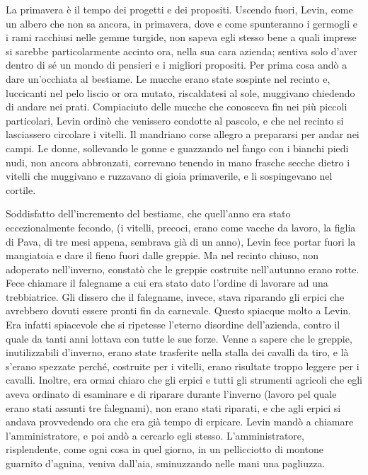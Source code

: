 La primavera è il tempo dei progetti e dei propositi. Uscendo fuori, Levin, come un albero che non sa ancora, in primavera, dove e come spunteranno i germogli e i rami racchiusi nelle gemme turgide, non sapeva egli stesso bene a quali imprese si sarebbe particolarmente accinto ora, nella sua cara azienda; sentiva solo d'aver dentro di sé un mondo di pensieri e i migliori propositi. Per prima cosa andò a dare un'occhiata al bestiame. Le mucche erano state sospinte nel recinto e, luccicanti nel pelo liscio or ora mutato, riscaldatesi al sole, muggivano chiedendo di andare nei prati. Compiaciuto delle mucche che conosceva fin nei più piccoli particolari, Levin ordinò che venissero condotte al pascolo, e che nel recinto si lasciassero circolare i vitelli. Il mandriano corse allegro a prepararsi per andar nei campi. Le donne, sollevando le gonne e guazzando nel fango con i bianchi piedi nudi, non ancora abbronzati, correvano tenendo in mano frasche secche dietro i vitelli che muggivano e ruzzavano di gioia primaverile, e li sospingevano nel cortile. 

Soddisfatto dell'incremento del bestiame, che quell'anno era stato eccezionalmente fecondo, (i vitelli, precoci, erano come vacche da lavoro, la figlia di Pava, di tre mesi appena, sembrava già di un anno), Levin fece portar fuori la mangiatoia e dare il fieno fuori dalle greppie. Ma nel recinto chiuso, non adoperato nell'inverno, constatò che le greppie costruite nell'autunno erano rotte. Fece chiamare il falegname a cui era stato dato l'ordine di lavorare ad una trebbiatrice. Gli dissero che il falegname, invece, stava riparando gli erpici che avrebbero dovuti essere pronti fin da carnevale. Questo spiacque molto a Levin. Era infatti spiacevole che si ripetesse l'eterno disordine dell'azienda, contro il quale da tanti anni lottava con tutte le sue forze. Venne a sapere che le greppie, inutilizzabili d'inverno, erano state trasferite nella stalla dei cavalli da tiro, e là s'erano spezzate perché, costruite per i vitelli, erano risultate troppo leggere per i cavalli. Inoltre, era ormai chiaro che gli erpici e tutti gli strumenti agricoli che egli aveva ordinato di esaminare e di riparare durante l'inverno (lavoro pel quale erano stati assunti tre falegnami), non erano stati riparati, e che agli erpici si andava provvedendo ora che era già tempo di erpicare. Levin mandò a chiamare l'amministratore, e poi andò a cercarlo egli stesso. L'amministratore, risplendente, come ogni cosa in quel giorno, in un pellicciotto di montone guarnito d'agnina, veniva dall'aia, sminuzzando nelle mani una pagliuzza. 

